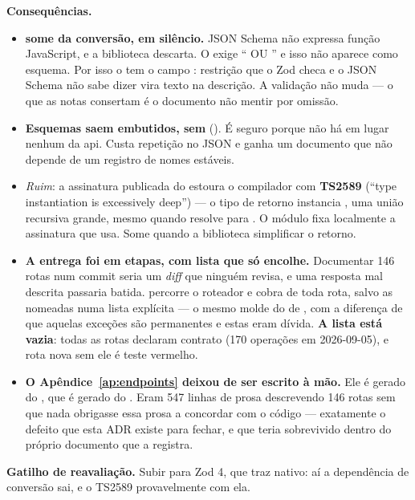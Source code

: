 \textbf{Consequências.}
\begin{itemize}
  \item \textbf{ some da conversão, em silêncio.} JSON Schema não
    expressa função JavaScript, e a biblioteca descarta. O
     exige \enquote{ OU
    } e isso não aparece como esquema. Por isso o 
    tem o campo : restrição que o Zod checa e o JSON Schema não sabe
    dizer vira texto na descrição. A validação não muda --- o que as notas
    consertam é o documento não mentir por omissão.
  \item \textbf{Esquemas saem embutidos, sem }
    (). É seguro porque não há  em lugar
    nenhum da api. Custa repetição no JSON e ganha um documento que não depende
    de um registro de nomes estáveis.
  \item \emph{Ruim}: a assinatura publicada do  estoura o
    compilador com \textbf{TS2589} (\enquote{type instantiation is excessively
    deep}) --- o tipo de retorno instancia , uma união
    recursiva grande, mesmo quando  resolve para
    . O módulo fixa localmente a assinatura que usa. Some quando a
    biblioteca simplificar o retorno.
  \item \textbf{A entrega foi em etapas, com lista que só encolhe.} Documentar
    146 rotas num commit seria um \emph{diff} que ninguém revisa, e uma resposta
    mal descrita passaria batida.  percorre o
    roteador e cobra  de toda rota, salvo as nomeadas numa lista
    explícita --- o mesmo molde do  de
    , com a diferença de que aquelas exceções são
    permanentes e estas eram dívida. \textbf{A lista está vazia}: todas as rotas
    declaram contrato (170 operações em 2026-09-05), e rota nova sem ele é teste
    vermelho.
  \item \textbf{O Apêndice~\ref{ap:endpoints} deixou de ser escrito à mão.} Ele
    é gerado do , que é gerado do . Eram
    547 linhas de prosa descrevendo 146 rotas sem que nada obrigasse essa prosa a
    concordar com o código --- exatamente o defeito que esta ADR existe para
    fechar, e que teria sobrevivido dentro do próprio documento que a registra.
\end{itemize}

\textbf{Gatilho de reavaliação.} Subir para Zod 4, que traz
 nativo: aí a dependência de conversão sai, e o TS2589
provavelmente com ela.


